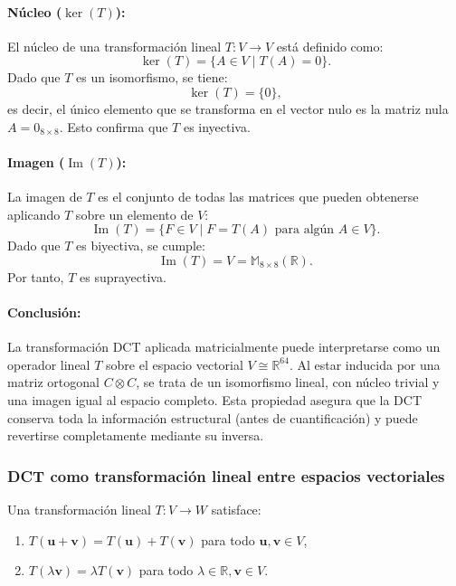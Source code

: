 \documentclass[8pt,a4paper]{article}
\theoremstyle{definition}
\theoremstyle{remark}
\begin{document}
\begin{multicols}{2}
            \paragraph{Núcleo (\( \ker(T) \)):}  
            El núcleo de una transformación lineal \( T: V \to V \) está definido como:
            \[
            \ker(T) = \{ A \in V \mid T(A) = 0 \}.
            \]
            Dado que \( T \) es un isomorfismo, se tiene:
            \[
            \ker(T) = \{ 0 \},
            \]
            es decir, el único elemento que se transforma en el vector nulo es la matriz nula \( A = 0_{8 \times 8} \). Esto confirma que \( T \) es inyectiva.
            
            \paragraph{Imagen (\( \operatorname{Im}(T) \)):}  
            La imagen de \( T \) es el conjunto de todas las matrices que pueden obtenerse aplicando \( T \) sobre un elemento de \( V \):
            \[
            \operatorname{Im}(T) = \{ F \in V \mid F = T(A) \text{ para algún } A \in V \}.
            \]
            Dado que \( T \) es biyectiva, se cumple:
            \[
            \operatorname{Im}(T) = V = \mathbb{M}_{8 \times 8}(\mathbb{R}).
            \]
            Por tanto, \( T \) es suprayectiva.
            
            \paragraph{Conclusión:}  
            La transformación DCT aplicada matricialmente puede interpretarse como un operador lineal \( T \) sobre el espacio vectorial \( V \cong \mathbb{R}^{64} \). Al estar inducida por una matriz ortogonal \( C \otimes C \), se trata de un isomorfismo lineal, con núcleo trivial y una imagen igual al espacio completo. Esta propiedad asegura que la DCT conserva toda la información estructural (antes de cuantificación) y puede revertirse completamente mediante su inversa.

            \subsubsection{DCT como transformación lineal entre espacios vectoriales}
    
            Una transformación lineal \( T: V \to W \) satisface:
            
            \begin{enumerate}
                \item \( T(\mathbf{u} + \mathbf{v}) = T(\mathbf{u}) + T(\mathbf{v}) \) para todo \( \mathbf{u}, \mathbf{v} \in V \),
                \item \( T(\lambda \mathbf{v}) = \lambda T(\mathbf{v}) \) para todo \( \lambda \in \mathbb{R}, \mathbf{v} \in V \).
            \end{enumerate}
            

\end{multicols}
\end{document}

